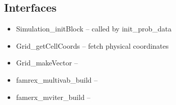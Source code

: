 \documentclass{article}
\begin{document}
\subsection{Interfaces}
\label{sec:flash-interfaces}
\begin{itemize}
\item Simulation_initBlock -- called by init\_prob\_data
\item Grid_getCellCoords -- fetch physical coordinates 
\item Grid_makeVector --
\item famrex_multivab_build --
\item famerx_mviter_build -- 

\end{itemize}
\end{document}
